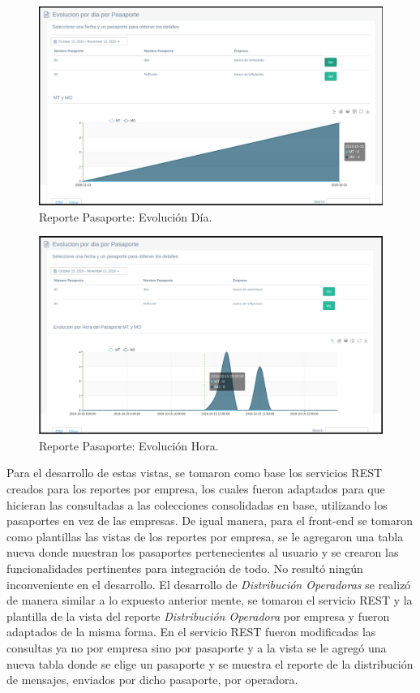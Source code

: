 \begin{figure}[ht]
  \centering
  \includegraphics[scale=0.30,type=png,ext=.png,read=.png]{imagenes/rped}
  \caption{Reporte Pasaporte: Evolución Día.}
  \label{fig:rped}
\end{figure}

\begin{figure}[ht]
  \centering
  \includegraphics[scale=0.30,type=png,ext=.png,read=.png]{imagenes/rpeh}
  \caption{Reporte Pasaporte: Evolución Hora.}
  \label{fig:rpeh}
\end{figure}

\indent Para el desarrollo de estas vistas, se tomaron como base los servicios REST creados para los reportes por empresa, los cuales fueron adaptados para que hicieran las consultadas a las colecciones consolidadas en base, utilizando los pasaportes en vez de las empresas. De igual manera, para el front-end se tomaron como plantillas las vistas de los reportes por empresa, se le agregaron una tabla nueva donde muestran los pasaportes pertenecientes al usuario y se crearon las funcionalidades pertinentes para integración de todo. No resultó ningún inconveniente en el desarrollo.
\newline
\newline
\indent El desarrollo de \textit{Distribución Operadoras} se realizó de manera similar a lo expuesto anterior mente, se tomaron el servicio REST y la plantilla de la vista del reporte \textit{Distribución Operadora} por empresa y fueron adaptados de la misma forma. En el servicio REST fueron modificadas las consultas ya no por empresa sino por pasaporte y a la vista se le agregó una nueva tabla donde se elige un pasaporte y se muestra el reporte de la distribución de mensajes, enviados por dicho pasaporte, por operadora.

